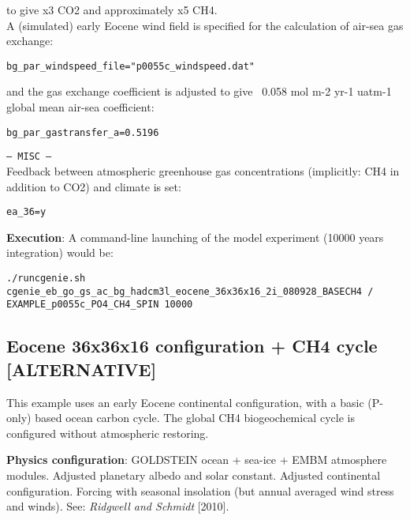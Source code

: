 \documentclass[10pt,twoside]{article}
\begin{document}
\begin{compactitem}
to give x3 CO2 and approximately x5 CH4.
			\\ A (simulated) early Eocene wind field is specified for the calculation of air-sea gas exchange:
\vspace{-5pt}\begin{verbatim}bg_par_windspeed_file="p0055c_windspeed.dat"\end{verbatim}\vspace{-5pt}
and the gas exchange coefficient is adjusted to give ~0.058 mol m-2 yr-1 uatm-1 global mean air-sea coefficient:
\vspace{-5pt}\begin{verbatim}bg_par_gastransfer_a=0.5196\end{verbatim}\vspace{-5pt}	
	\item \texttt{--- MISC ---}
	\\ Feedback between atmospheric greenhouse gas concentrations (implicitly: CH4 in addition to CO2) and climate is set:
\vspace{-5pt}\begin{verbatim}ea_36=y\end{verbatim}\vspace{-5pt}
	\end{compactitem}

\noindent \textbf{Execution}: A command-line launching of the model experiment (10000 years integration) would be:
\vspace{-11pt}\begin{verbatim}./runcgenie.sh cgenie_eb_go_gs_ac_bg_hadcm3l_eocene_36x36x16_2i_080928_BASECH4 /
EXAMPLE_p0055c_PO4_CH4_SPIN 10000\end{verbatim}\vspace{-5pt}



\subsection{Eocene 36x36x16 configuration + CH4 cycle [ALTERNATIVE]}\label{EXAMPLE_p0055c_PO4_CH4_SPIN2}

This example uses an early Eocene continental configuration, with a basic (P-only) based ocean carbon cycle. The global CH4 biogeochemical cycle is configured without atmospheric restoring.

\noindent \textbf{Physics configuration}: GOLDSTEIN ocean + sea-ice + EMBM atmosphere modules. Adjusted planetary albedo and solar constant. Adjusted continental configuration. Forcing with seasonal insolation (but annual averaged wind stress and winds). See: \textit{Ridgwell and Schmidt} [2010].
\end{document}
